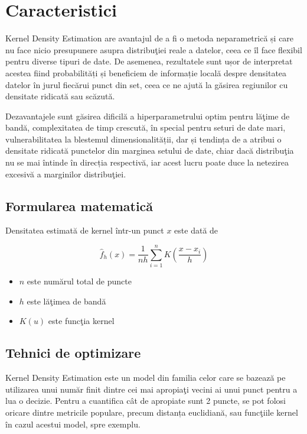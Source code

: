 \section{Caracteristici}

Kernel Density Estimation are avantajul de a fi o metoda 
neparametrică și care nu face nicio presupunere asupra 
distribuţiei reale a datelor, ceea ce îl face flexibil 
pentru diverse tipuri de date. De asemenea, rezultatele 
sunt ușor de interpretat acestea fiind probabilități și 
beneficiem de informație locală despre
densitatea datelor în jurul fiecărui punct 
din set, ceea ce ne ajută la găsirea regiunilor cu densitate ridicată 
sau scăzută.

Dezavantajele sunt găsirea dificilă a hiperparametrului 
optim pentru 
lăţime de bandă, complexitatea de timp crescută, în special 
pentru seturi de date mari, vulnerabilitatea la blestemul 
dimensionalității, dar și tendința de a atribui o densitate 
ridicată punctelor din marginea setului de date, chiar 
dacă distribuţia nu se mai întinde în direcția respectivă, 
iar acest lucru poate duce la netezirea excesivă a marginilor 
distribuţiei.

\subsection{Formularea matematică}

Densitatea estimată de kernel într-un punct $x$ este dată de

\begin{equation}
\hat{f}_h(x) = \frac{1}{nh} \sum_{i=1}^{n} K\left(\frac{x - x_i}{h}\right)
\end{equation}

\begin{itemize}
    \item $n$ este numărul total de puncte
    \item $h$ este lăţimea de bandă
    \item $K(u)$ este funcţia kernel 
\end{itemize}

\subsection{Tehnici de optimizare}

Kernel Density Estimation este un model din familia celor care 
se bazează pe utilizarea unui număr finit 
dintre cei mai apropiaţi vecini ai unui punct pentru a lua 
o decizie. Pentru a cuantifica cât de apropiate sunt 2 puncte, 
se pot folosi oricare dintre metricile populare, precum distanța 
euclidiană, sau funcţiile kernel în cazul acestui model, spre exemplu.


